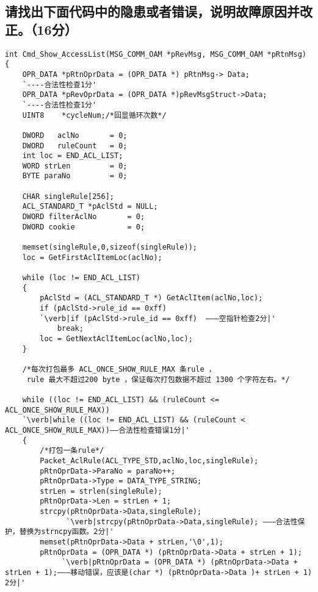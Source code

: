 ﻿\documentclass  [11pt,onecolumn,a4paper]{article}
\begin{document}
\subsection{请找出下面代码中的隐患或者错误，说明故障原因并改正。（16分）}
\begin{lstlisting}[escapeinside=`']
int Cmd_Show_AccessList(MSG_COMM_OAM *pRevMsg, MSG_COMM_OAM *pRtnMsg)
{
    OPR_DATA *pRtnOprData = (OPR_DATA *) pRtnMsg-> Data;    
    `----合法性检查1分'
    OPR_DATA *pRevOprData = (OPR_DATA *)pRevMsgStruct->Data;
    `----合法性检查1分'
    UINT8    *cycleNum;/*回显循环次数*/

    DWORD   aclNo       = 0;
    DWORD   ruleCount   = 0;
    int loc = END_ACL_LIST;
    WORD strLen         = 0;
    BYTE paraNo         = 0;  

    CHAR singleRule[256];
    ACL_STANDARD_T *pAclStd = NULL;
    DWORD filterAclNo       = 0;	
    DWORD cookie            = 0;

    memset(singleRule,0,sizeof(singleRule));
    loc = GetFirstAclItemLoc(aclNo);

    while (loc != END_ACL_LIST)
    {
        pAclStd = (ACL_STANDARD_T *) GetAclItem(aclNo,loc);
        if (pAclStd->rule_id == 0xff)
        `\verb|if (pAclStd->rule_id == 0xff)  ―――空指针检查2分|'
            break;
        loc = GetNextAclItemLoc(aclNo,loc);
    }

    /*每次打包最多 ACL_ONCE_SHOW_RULE_MAX 条rule ，
     rule 最大不超过200 byte ，保证每次打包数据不超过 1300 个字符左右。*/

    while ((loc != END_ACL_LIST) && (ruleCount <= ACL_ONCE_SHOW_RULE_MAX))
    `\verb|while ((loc != END_ACL_LIST) && (ruleCount < ACL_ONCE_SHOW_RULE_MAX))――合法性检查错误1分|'
    {
        /*打包一条rule*/
        Packet_AclRule(ACL_TYPE_STD,aclNo,loc,singleRule);
        pRtnOprData->ParaNo = paraNo++;
		pRtnOprData->Type = DATA_TYPE_STRING;
		strLen = strlen(singleRule);
		pRtnOprData->Len = strLen + 1;
		strcpy(pRtnOprData->Data,singleRule);
              `\verb|strcpy(pRtnOprData->Data,singleRule); ―――合法性保护，替换为strncpy函数。2分|'
		memset(pRtnOprData->Data + strLen,'\0',1);
		pRtnOprData = (OPR_DATA *) (pRtnOprData->Data + strLen + 1);
             `\verb|pRtnOprData = (OPR_DATA *) (pRtnOprData->Data + strLen + 1);―――移动错误，应该是(char *) (pRtnOprData->Data )+ strLen + 1) 2分|'
		

\end{lstlisting}
\end{document}

